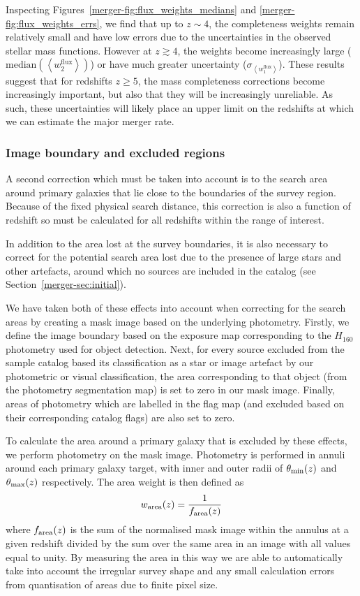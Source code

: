 Inspecting Figures~\ref{merger-fig:flux_weights_medians} and \ref{merger-fig:flux_weights_errs}, we find that up to $z\sim4$, the completeness weights remain relatively small and have low errors due to the uncertainties in the observed stellar mass functions. However at $z\gtrsim4$, the weights become increasingly large ($\text{median} (\left \langle w^{\text{flux}}_{2} \right \rangle)$) or have much greater uncertainty ($\sigma_{\left \langle w^{\text{flux}}_{1} \right \rangle}$). These results suggest that for redshifts $z \geq 5$, the mass completeness corrections become increasingly important, but also that they will be increasingly unreliable. As such, these uncertainties will likely place an upper limit on the redshifts at which we can estimate the major merger rate. 

\subsubsection{Image boundary and excluded regions}\label{merger-sec:weights_area}
A second correction which must be taken into account is to the search area around primary galaxies that lie close to the boundaries of the survey region. Because of the fixed physical search distance, this correction is also a function of redshift so must be calculated for all redshifts within the range of interest.

In addition to the area lost at the survey boundaries, it is also necessary to correct for the potential search area lost due to the presence of large stars and other artefacts, around which no sources are included in the catalog (see Section~\ref{merger-sec:initial}). 

We have taken both of these effects into account when correcting for the search areas by creating a mask image based on the underlying photometry. Firstly, we define the image boundary based on the exposure map corresponding to the $H_{160}$ photometry used for object detection. Next, for every source excluded from the sample catalog based its classification as a star or image artefact by our photometric or visual classification, the area corresponding to that object (from the photometry segmentation map) is set to zero in our mask image. Finally, areas of photometry which are labelled in the flag map (and excluded based on their corresponding catalog flags) are also set to zero.

To calculate the area around a primary galaxy that is excluded by these effects, we perform photometry on the mask image.  Photometry is performed in annuli around each primary galaxy target, with inner and outer radii of $\theta_{\rm{min}}(z)$ and $\theta_{\rm{max}}(z)$ respectively. The area weight is then defined as
\begin{equation}
	w_{\rm{area}}(z) = \frac{1} {f_{	\rm{area}}(z)}
\end{equation}
where $f_{	\rm{area}}(z)$ is the sum of the normalised mask image within the annulus at a given redshift divided by the sum over the same area in an image with all values equal to unity. By measuring the area in this way we are able to automatically take into account the irregular survey shape and any small calculation errors from quantisation of areas due to finite pixel size.

